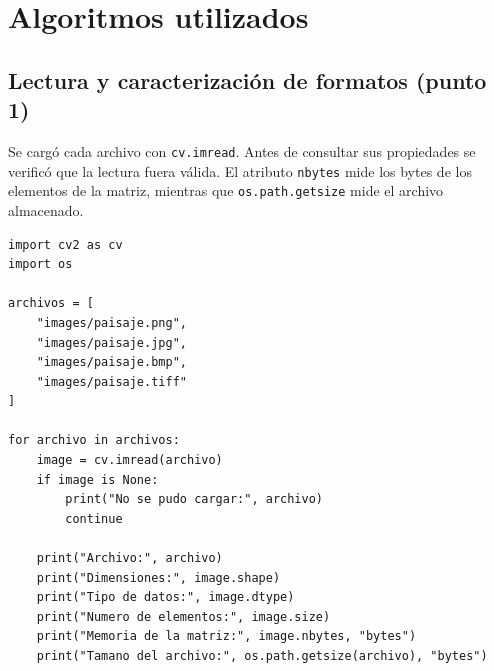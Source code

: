 \documentclass[11pt,a4paper]{article}
\begin{document}
\section{Algoritmos utilizados}
\subsection{Lectura y caracterizaci\'on de formatos (punto 1)}
Se carg\'o cada archivo con \texttt{cv.imread}. Antes de consultar sus
propiedades se verific\'o que la lectura fuera v\'alida. El atributo
\texttt{nbytes} mide los bytes de los elementos de la matriz, mientras que
\texttt{os.path.getsize} mide el archivo almacenado.
\begin{lstlisting}
import cv2 as cv
import os

archivos = [
    "images/paisaje.png",
    "images/paisaje.jpg",
    "images/paisaje.bmp",
    "images/paisaje.tiff"
]

for archivo in archivos:
    image = cv.imread(archivo)
    if image is None:
        print("No se pudo cargar:", archivo)
        continue

    print("Archivo:", archivo)
    print("Dimensiones:", image.shape)
    print("Tipo de datos:", image.dtype)
    print("Numero de elementos:", image.size)
    print("Memoria de la matriz:", image.nbytes, "bytes")
    print("Tamano del archivo:", os.path.getsize(archivo), "bytes")
\end{lstlisting}
\end{document}

